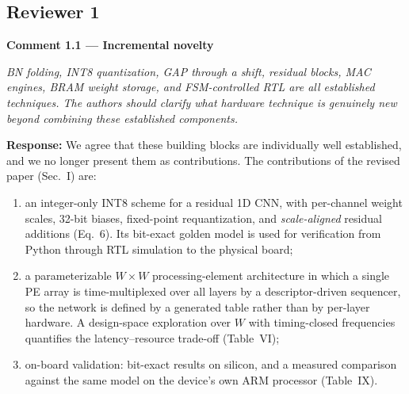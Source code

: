 \documentclass[10pt,a4paper]{article}
\begin{document}
\newcommand{\rc}[2]{\par\medskip\noindent\textbf{#1}\par\noindent\textit{#2}\par\smallskip\noindent\textbf{Response:} }

\subsection*{Reviewer 1}

\rc{Comment 1.1 --- Incremental novelty}{BN folding, INT8 quantization, GAP through a shift, residual blocks, MAC engines, BRAM weight storage, and FSM-controlled RTL are all established techniques. The authors should clarify what hardware technique is genuinely new beyond combining these established components.}
We agree that these building blocks are individually well established, and we no longer present them as contributions. The contributions of the revised paper (Sec.~I) are:
\begin{enumerate}
  \item an integer-only INT8 scheme for a residual 1D CNN, with per-channel weight scales, 32-bit
  biases, fixed-point requantization, and \emph{scale-aligned} residual additions (Eq.~6). Its
  bit-exact golden model is used for verification from Python through RTL simulation to the
  physical board;
  \item a parameterizable $W{\times}W$ processing-element architecture in which a single PE array
  is time-multiplexed over all layers by a descriptor-driven sequencer, so the network is
  defined by a generated table rather than by per-layer hardware. A design-space exploration
  over $W$ with timing-closed frequencies quantifies the latency--resource trade-off
  (Table~VI);
  \item on-board validation: bit-exact results on silicon, and a measured comparison against the
  same model on the device's own ARM processor (Table~IX).
\end{enumerate}
\end{document}
